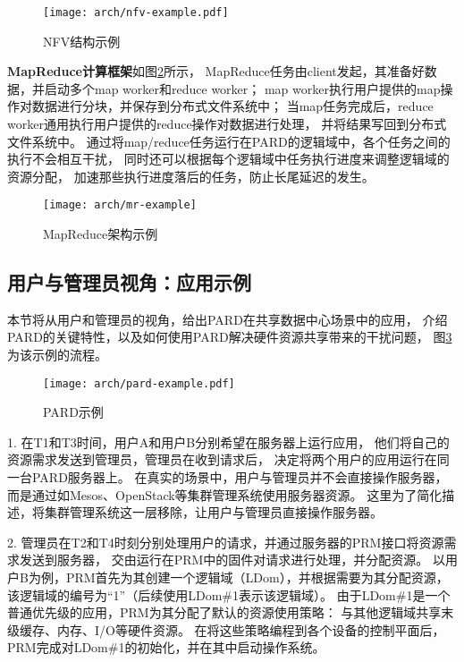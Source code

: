 \begin{figure}[htb]
  \centering
  \texttt{[image: arch/nfv-example.pdf]}
  \caption{NFV结构示例\cite{etsi_nfv_2014}}
  \label{fig:nfv-example}
\end{figure}


\textbf{MapReduce计算框架}如图\ref{fig:mr-example}所示，
MapReduce任务由client发起，其准备好数据，并启动多个map worker和reduce worker；
map worker执行用户提供的map操作对数据进行分块，并保存到分布式文件系统中；
当map任务完成后，reduce worker通用执行用户提供的reduce操作对数据进行处理，
并将结果写回到分布式文件系统中。
通过将map/reduce任务运行在PARD的逻辑域中，各个任务之间的执行不会相互干扰，
同时还可以根据每个逻辑域中任务执行进度来调整逻辑域的资源分配，
加速那些执行进度落后的任务，防止长尾延迟的发生。

\begin{figure}[htb]
  \centering
  \texttt{[image: arch/mr-example]}
  \caption{MapReduce架构示例}
  \label{fig:mr-example}
\end{figure}


\subsection{用户与管理员视角：应用示例}

本节将从用户和管理员的视角，给出PARD在共享数据中心场景中的应用，
介绍PARD的关键特性，以及如何使用PARD解决硬件资源共享带来的干扰问题，
图\ref{fig:pard-example}为该示例的流程。

\begin{figure}[b]
  \centering
  \texttt{[image: arch/pard-example.pdf]}
  \caption{PARD示例}
  \label{fig:pard-example}
\end{figure}

1. 在T1和T3时间，用户A和用户B分别希望在服务器上运行应用，
他们将自己的资源需求发送到管理员，管理员在收到请求后，
决定将两个用户的应用运行在同一台PARD服务器上。
在真实的场景中，用户与管理员并不会直接操作服务器，
而是通过如Mesos\cite{Hindman:2011:Mesos}、OpenStack\cite{OpenStack}等集群管理系统使用服务器资源。
这里为了简化描述，将集群管理系统这一层移除，让用户与管理员直接操作服务器。

2. 管理员在T2和T4时刻分别处理用户的请求，并通过服务器的PRM接口将资源需求发送到服务器，
交由运行在PRM中的固件对请求进行处理，并分配资源。
以用户B为例，PRM首先为其创建一个逻辑域（LDom），并根据需要为其分配资源，
该逻辑域的编号为``1''（后续使用LDom\#1表示该逻辑域）。
由于LDom\#1是一个普通优先级的应用，PRM为其分配了默认的资源使用策略：
与其他逻辑域共享末级缓存、内存、I/O等硬件资源。
在将这些策略编程到各个设备的控制平面后，PRM完成对LDom\#1的初始化，并在其中启动操作系统。

